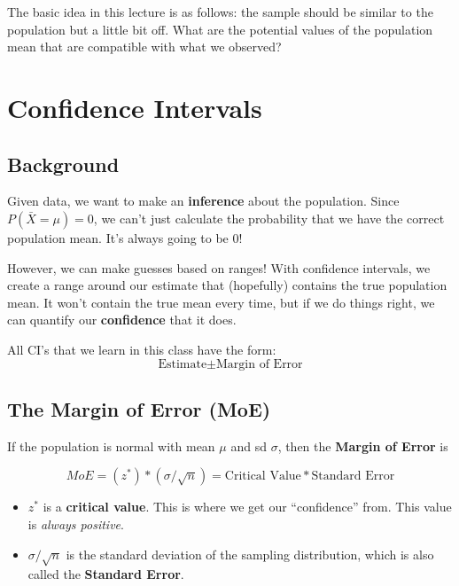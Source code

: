 \documentclass[
  letterpaper,
  DIV=11,
  numbers=noendperiod]{scrreprt}
\providecommand{\tightlist}{%
  \setlength{\itemsep}{0pt}\setlength{\parskip}{0pt}}\usepackage{longtable,booktabs,array}
\begin{document}
The basic idea in this lecture is as follows: the sample should be
similar to the population but a little bit off. What are the potential
values of the population mean that are compatible with what we observed?

\hypertarget{confidence-intervals}{%
\chapter{Confidence Intervals}\label{confidence-intervals}}

\hypertarget{background}{%
\section{Background}\label{background}}

Given data, we want to make an \textbf{inference} about the population.
Since \(P(\bar X = \mu) = 0\), we can't just calculate the probability
that we have the correct population mean. It's always going to be 0!

However, we can make guesses based on ranges! With confidence intervals,
we create a range around our estimate that (hopefully) contains the true
population mean. It won't contain the true mean every time, but if we do
things right, we can quantify our \textbf{confidence} that it does.

All CI's that we learn in this class have the form: \[
\text{Estimate} \pm \text{Margin of Error}
\]

\hypertarget{the-margin-of-error-moe}{%
\section{The Margin of Error (MoE)}\label{the-margin-of-error-moe}}

If the population is normal with mean \(\mu\) and sd \(\sigma\), then
the \textbf{Margin of Error} is

\[
MoE = (z^*)*(\sigma/\sqrt{n}) = \text{Critical Value}*\text{Standard Error}
\]

\begin{itemize}
\tightlist
\item
  \(z^*\) is a \textbf{critical value}. This is where we get our
  ``confidence'' from. This value is \emph{always positive}.
\item
  \(\sigma/\sqrt{n}\) is the standard deviation of the sampling
  distribution, which is also called the \textbf{Standard Error}.
\end{itemize}
\end{document}
